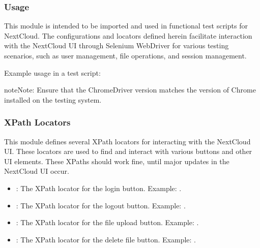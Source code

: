 \documentclass[letterpaper,10pt,english]{sphinxmanual}
\begin{document}
\subsubsection{Usage}
\label{\detokenize{config:usage}}
\sphinxAtStartPar
This module is intended to be imported and used in functional test scripts for NextCloud. The configurations and locators defined herein facilitate interaction with the NextCloud UI through Selenium WebDriver for various testing scenarios, such as user management, file operations, and session management.

\sphinxAtStartPar
Example usage in a test script:

\begin{sphinxVerbatim}[commandchars=\\\{\}]
   
   

  
\end{sphinxVerbatim}

\begin{sphinxadmonition}{note}{Note:}
\sphinxAtStartPar
Ensure that the ChromeDriver version matches the version of Chrome installed on the testing system.
\end{sphinxadmonition}


\subsubsection{XPath Locators}
\label{\detokenize{config:xpath-locators}}
\sphinxAtStartPar
This module defines several XPath locators for interacting with the NextCloud UI. These locators are used to find and interact with various buttons and other UI elements. These XPaths should work fine, until major updates in the NextCloud UI occur.
\begin{itemize}
\item {} 
\sphinxAtStartPar
{}: The XPath locator for the login button. Example: .

\item {} 
\sphinxAtStartPar
{}: The XPath locator for the logout button. Example: .

\item {} 
\sphinxAtStartPar
{}: The XPath locator for the file upload button. Example: .

\item {} 
\sphinxAtStartPar
{}: The XPath locator for the delete file button. Example: .

\end{itemize}
\end{document}
